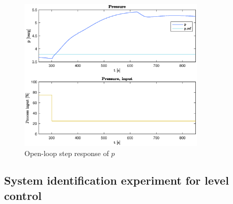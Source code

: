 \documentclass[12pt]{article}
\begin{document}
\begin{figure}[p]
\centering
\includegraphics[width=0.8\textwidth]{../Systemanalyse/Log_Data_to_Matlab/Figurer/Stegeksperimenter/PC1024.eps}
\caption{Open-loop step response of $p$}
\label{fig:ol_step_PC1024}
\end{figure}

\subsection{System identification experiment for level control}
\end{document}
